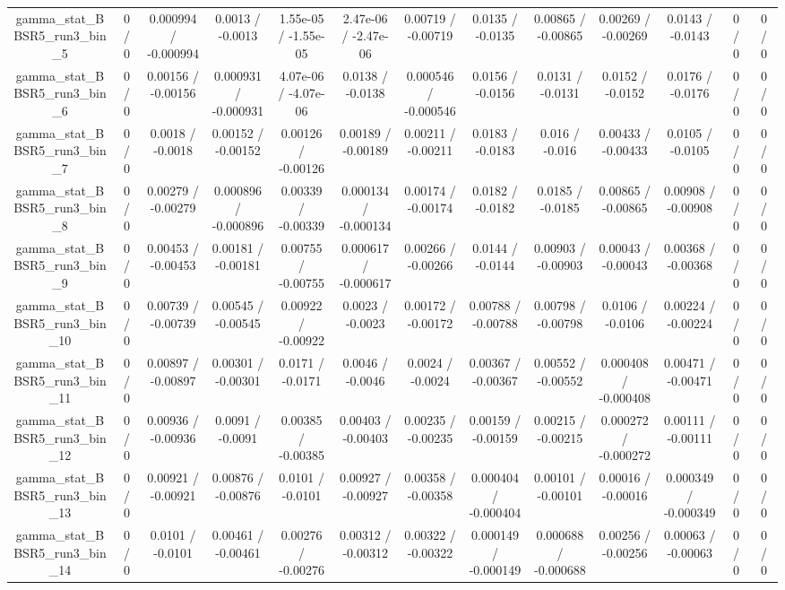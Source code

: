 \documentclass[10pt]{article}
\begin{document}
\begin{table}[htbp]
\begin{center}
\begin{tabular}{|c|c|c|c|c|c|c|c|c|c|c|c|c|}
  gamma_stat_BBSR5_run3_bin_5 & 0 / 0 & 0.000994 / -0.000994 & 0.0013 / -0.0013 & 1.55e-05 / -1.55e-05 & 2.47e-06 / -2.47e-06 & 0.00719 / -0.00719 & 0.0135 / -0.0135 & 0.00865 / -0.00865 & 0.00269 / -0.00269 & 0.0143 / -0.0143 & 0 / 0 & 0 / 0 \\ 
  gamma_stat_BBSR5_run3_bin_6 & 0 / 0 & 0.00156 / -0.00156 & 0.000931 / -0.000931 & 4.07e-06 / -4.07e-06 & 0.0138 / -0.0138 & 0.000546 / -0.000546 & 0.0156 / -0.0156 & 0.0131 / -0.0131 & 0.0152 / -0.0152 & 0.0176 / -0.0176 & 0 / 0 & 0 / 0 \\ 
  gamma_stat_BBSR5_run3_bin_7 & 0 / 0 & 0.0018 / -0.0018 & 0.00152 / -0.00152 & 0.00126 / -0.00126 & 0.00189 / -0.00189 & 0.00211 / -0.00211 & 0.0183 / -0.0183 & 0.016 / -0.016 & 0.00433 / -0.00433 & 0.0105 / -0.0105 & 0 / 0 & 0 / 0 \\ 
  gamma_stat_BBSR5_run3_bin_8 & 0 / 0 & 0.00279 / -0.00279 & 0.000896 / -0.000896 & 0.00339 / -0.00339 & 0.000134 / -0.000134 & 0.00174 / -0.00174 & 0.0182 / -0.0182 & 0.0185 / -0.0185 & 0.00865 / -0.00865 & 0.00908 / -0.00908 & 0 / 0 & 0 / 0 \\ 
  gamma_stat_BBSR5_run3_bin_9 & 0 / 0 & 0.00453 / -0.00453 & 0.00181 / -0.00181 & 0.00755 / -0.00755 & 0.000617 / -0.000617 & 0.00266 / -0.00266 & 0.0144 / -0.0144 & 0.00903 / -0.00903 & 0.00043 / -0.00043 & 0.00368 / -0.00368 & 0 / 0 & 0 / 0 \\ 
  gamma_stat_BBSR5_run3_bin_10 & 0 / 0 & 0.00739 / -0.00739 & 0.00545 / -0.00545 & 0.00922 / -0.00922 & 0.0023 / -0.0023 & 0.00172 / -0.00172 & 0.00788 / -0.00788 & 0.00798 / -0.00798 & 0.0106 / -0.0106 & 0.00224 / -0.00224 & 0 / 0 & 0 / 0 \\ 
  gamma_stat_BBSR5_run3_bin_11 & 0 / 0 & 0.00897 / -0.00897 & 0.00301 / -0.00301 & 0.0171 / -0.0171 & 0.0046 / -0.0046 & 0.0024 / -0.0024 & 0.00367 / -0.00367 & 0.00552 / -0.00552 & 0.000408 / -0.000408 & 0.00471 / -0.00471 & 0 / 0 & 0 / 0 \\ 
  gamma_stat_BBSR5_run3_bin_12 & 0 / 0 & 0.00936 / -0.00936 & 0.0091 / -0.0091 & 0.00385 / -0.00385 & 0.00403 / -0.00403 & 0.00235 / -0.00235 & 0.00159 / -0.00159 & 0.00215 / -0.00215 & 0.000272 / -0.000272 & 0.00111 / -0.00111 & 0 / 0 & 0 / 0 \\ 
  gamma_stat_BBSR5_run3_bin_13 & 0 / 0 & 0.00921 / -0.00921 & 0.00876 / -0.00876 & 0.0101 / -0.0101 & 0.00927 / -0.00927 & 0.00358 / -0.00358 & 0.000404 / -0.000404 & 0.00101 / -0.00101 & 0.00016 / -0.00016 & 0.000349 / -0.000349 & 0 / 0 & 0 / 0 \\ 
  gamma_stat_BBSR5_run3_bin_14 & 0 / 0 & 0.0101 / -0.0101 & 0.00461 / -0.00461 & 0.00276 / -0.00276 & 0.00312 / -0.00312 & 0.00322 / -0.00322 & 0.000149 / -0.000149 & 0.000688 / -0.000688 & 0.00256 / -0.00256 & 0.00063 / -0.00063 & 0 / 0 & 0 / 0 \\ 

\end{tabular}
\end{center}
\end{table}
\end{document}

